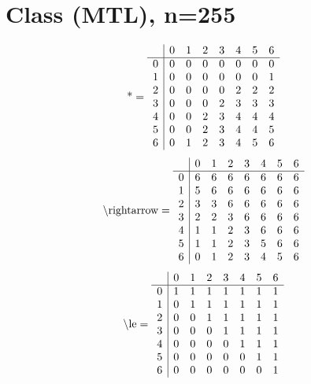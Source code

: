 \documentclass[11pt]{article}
\begin{document}
\section{Class (MTL), n=255}
\[\text{*} = 
\begin{array}{r | r r r r r r r}
 & 0 & 1 & 2 & 3 & 4 & 5 & 6 \\ \hline
0 & 0 & 0 & 0 & 0 & 0 & 0 & 0 \\
1 & 0 & 0 & 0 & 0 & 0 & 0 & 1 \\
2 & 0 & 0 & 0 & 0 & 2 & 2 & 2 \\
3 & 0 & 0 & 0 & 2 & 3 & 3 & 3 \\
4 & 0 & 0 & 2 & 3 & 4 & 4 & 4 \\
5 & 0 & 0 & 2 & 3 & 4 & 4 & 5 \\
6 & 0 & 1 & 2 & 3 & 4 & 5 & 6 \\
\end{array}
\]
\[\text{\textbackslash rightarrow} = 
\begin{array}{r | r r r r r r r}
 & 0 & 1 & 2 & 3 & 4 & 5 & 6 \\ \hline
0 & 6 & 6 & 6 & 6 & 6 & 6 & 6 \\
1 & 5 & 6 & 6 & 6 & 6 & 6 & 6 \\
2 & 3 & 3 & 6 & 6 & 6 & 6 & 6 \\
3 & 2 & 2 & 3 & 6 & 6 & 6 & 6 \\
4 & 1 & 1 & 2 & 3 & 6 & 6 & 6 \\
5 & 1 & 1 & 2 & 3 & 5 & 6 & 6 \\
6 & 0 & 1 & 2 & 3 & 4 & 5 & 6 \\
\end{array}
\]
\[\text{\textbackslash le} = 
\begin{array}{r | r r r r r r r}
 & 0 & 1 & 2 & 3 & 4 & 5 & 6 \\ \hline
0 & 1 & 1 & 1 & 1 & 1 & 1 & 1 \\
1 & 0 & 1 & 1 & 1 & 1 & 1 & 1 \\
2 & 0 & 0 & 1 & 1 & 1 & 1 & 1 \\
3 & 0 & 0 & 0 & 1 & 1 & 1 & 1 \\
4 & 0 & 0 & 0 & 0 & 1 & 1 & 1 \\
5 & 0 & 0 & 0 & 0 & 0 & 1 & 1 \\
6 & 0 & 0 & 0 & 0 & 0 & 0 & 1 \\
\end{array}
\]
\end{document}
